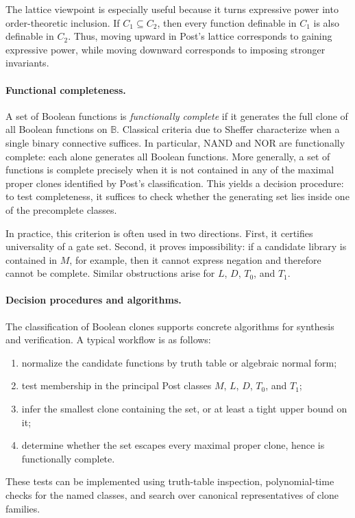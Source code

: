\documentclass[11pt]{article}
\begin{document}
The lattice viewpoint is especially useful because it turns expressive power into order-theoretic inclusion. If $C_1 \subseteq C_2$, then every function definable in $C_1$ is also definable in $C_2$. Thus, moving upward in Post's lattice corresponds to gaining expressive power, while moving downward corresponds to imposing stronger invariants.

\paragraph{Functional completeness.}
A set of Boolean functions is \emph{functionally complete} if it generates the full clone of all Boolean functions on $\mathbb{B}$. Classical criteria due to Sheffer characterize when a single binary connective suffices. In particular, NAND and NOR are functionally complete: each alone generates all Boolean functions. More generally, a set of functions is complete precisely when it is not contained in any of the maximal proper clones identified by Post's classification. This yields a decision procedure: to test completeness, it suffices to check whether the generating set lies inside one of the precomplete classes.

In practice, this criterion is often used in two directions. First, it certifies universality of a gate set. Second, it proves impossibility: if a candidate library is contained in $M$, for example, then it cannot express negation and therefore cannot be complete. Similar obstructions arise for $L$, $D$, $T_0$, and $T_1$.

\paragraph{Decision procedures and algorithms.}
The classification of Boolean clones supports concrete algorithms for synthesis and verification. A typical workflow is as follows:
\begin{enumerate}
  \item normalize the candidate functions by truth table or algebraic normal form;
  \item test membership in the principal Post classes $M$, $L$, $D$, $T_0$, and $T_1$;
  \item infer the smallest clone containing the set, or at least a tight upper bound on it;
  \item determine whether the set escapes every maximal proper clone, hence is functionally complete.
\end{enumerate}
These tests can be implemented using truth-table inspection, polynomial-time checks for the named classes, and search over canonical representatives of clone families.
\end{document}
